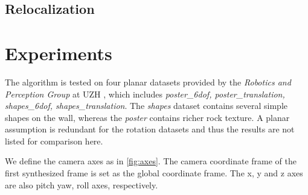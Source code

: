 \subsection{Relocalization}
\label{sec:relocalization}

\section{Experiments}
\label{sec:experiments}
The algorithm is tested on four planar datasets provided by the
\textit{Robotics and Perception Group} at UZH
\citep{mueggler2017event}, which includes \textit{poster\_6dof,
  poster\_translation, shapes\_6dof, shapes\_translation}. The
\textit{shapes} dataset contains several simple shapes on the wall,
whereas the \textit{poster} contains richer rock texture. A planar
assumption is redundant for the rotation datasets and thus the results
are not listed for comparison here.

We define the camera axes as in \cref{fig:axes}. The camera coordinate
frame of the first synthesized frame is set as the global coordinate
frame. The x, y and z axes are also pitch yaw, roll axes,
respectively.

